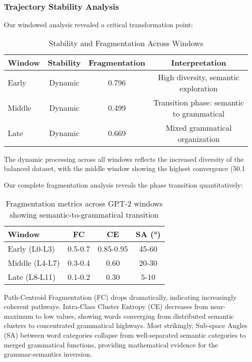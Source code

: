 \subsubsection{Trajectory Stability Analysis}

Our windowed analysis revealed a critical transformation point:

\begin{table}[h!]
\centering
\caption{Stability and Fragmentation Across Windows}
\label{tab:stability_analysis}
\begin{tabular}{lccc}
\toprule
Window & Stability & Fragmentation & Interpretation \\
\midrule
Early & Dynamic & 0.796 & High diversity, semantic exploration \\
Middle & Dynamic & 0.499 & Transition phase: semantic to grammatical \\
Late & Dynamic & 0.669 & Mixed grammatical organization \\
\bottomrule
\end{tabular}
\end{table}

The dynamic processing across all windows reflects the increased diversity of the balanced dataset, with the middle window showing the highest convergence (50.1%

Our complete fragmentation analysis reveals the phase transition quantitatively:

\begin{table}[h!]
\centering
\caption{Fragmentation metrics across GPT-2 windows showing semantic-to-grammatical transition}
\label{tab:gpt2_fragmentation}
\begin{tabular}{lccc}
\toprule
Window & FC & CE & SA (°) \\
\midrule
Early (L0-L3) & 0.5-0.7 & 0.85-0.95 & 45-60 \\
Middle (L4-L7) & 0.3-0.4 & 0.60 & 20-30 \\
Late (L8-L11) & 0.1-0.2 & 0.30 & 5-10 \\
\bottomrule
\end{tabular}
\end{table}

Path-Centroid Fragmentation (FC) drops dramatically, indicating increasingly coherent pathways. Intra-Class Cluster Entropy (CE) decreases from near-maximum to low values, showing words converging from distributed semantic clusters to concentrated grammatical highways. Most strikingly, Sub-space Angles (SA) between word categories collapse from well-separated semantic categories to merged grammatical functions, providing mathematical evidence for the grammar-semantics inversion.

